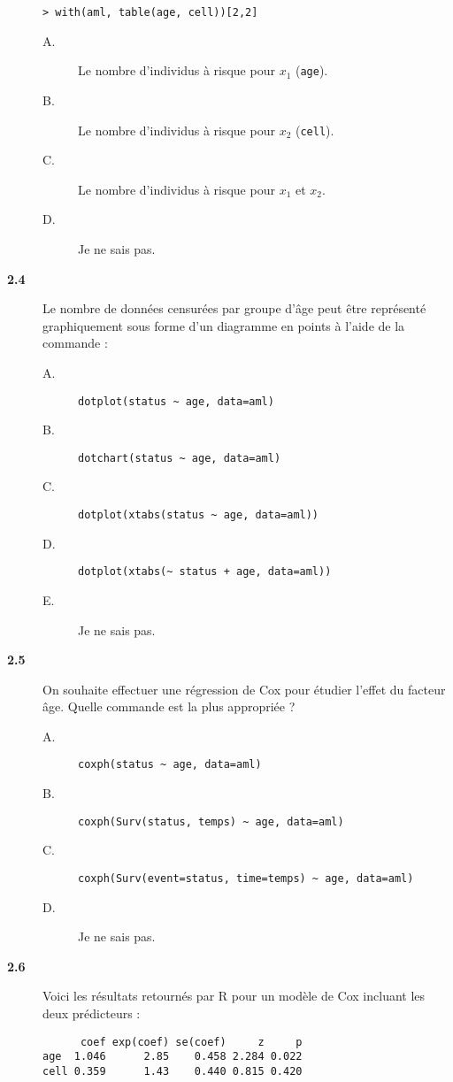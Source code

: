 \documentclass[11pt]{report}
\theoremstyle{definition}
\newcommand{\R}{\textsf{R}\xspace}
\begin{document}
\begin{description}
\begin{verbatim}
> with(aml, table(age, cell))[2,2]
\end{verbatim}
  \begin{description}
  \item[A.] Le nombre d'individus à risque pour $x_1$ (\texttt{age}).
  \item[B.] Le nombre d'individus à risque pour $x_2$ (\texttt{cell}).
  \item[C.] Le nombre d'individus à risque pour $x_1$ et $x_2$.
  \item[D.] Je ne sais pas.
  \end{description}
\item[\bf 2.4]  Le nombre de données censurées par
  groupe d'âge peut être représenté graphiquement sous forme d'un diagramme
  en points à l'aide de la commande :
  \begin{description}
  \item[A.] \verb|dotplot(status ~ age, data=aml)|
  \item[B.] \verb|dotchart(status ~ age, data=aml)|
  \item[C.] \verb|dotplot(xtabs(status ~ age, data=aml))|
  \item[D.] \verb|dotplot(xtabs(~ status + age, data=aml))|
  \item[E.] Je ne sais pas.
  \end{description}  
\item[\bf 2.5]  On souhaite effectuer une
  régression de Cox pour étudier l'effet du facteur âge. Quelle commande est
  la plus appropriée ?
  \begin{description}
  \item[A.] \verb|coxph(status ~ age, data=aml)|
  \item[B.] \verb|coxph(Surv(status, temps) ~ age, data=aml)|
  \item[C.] \verb|coxph(Surv(event=status, time=temps) ~ age, data=aml)|
  \item[D.] Je ne sais pas.
  \end{description}
\item[\bf 2.6]  Voici les résultats retournés par
  \R pour un modèle de Cox incluant les deux prédicteurs :
\begin{verbatim}
      coef exp(coef) se(coef)     z     p
age  1.046      2.85    0.458 2.284 0.022
cell 0.359      1.43    0.440 0.815 0.420
\end{verbatim}

\end{description}
\end{document}

